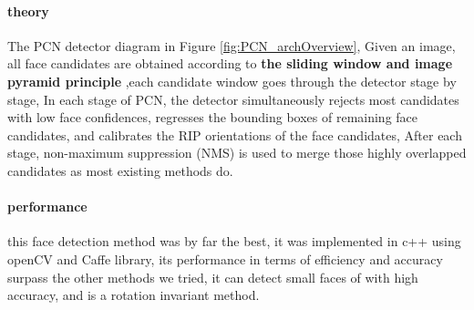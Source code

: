 \paragraph{theory}
The PCN detector diagram in Figure \ref{fig:PCN_archOverview}, Given an image, all face candidates are obtained according to \textbf{the sliding window and image pyramid principle} ,each candidate window goes through the detector stage by stage, In each stage of PCN, the detector simultaneously rejects most candidates with low face confidences, regresses the bounding boxes of remaining face candidates, and calibrates the RIP orientations of the face candidates, After each stage, non-maximum suppression (NMS) is used to merge those highly overlapped candidates as most existing methods do.
\paragraph{performance}
this face detection method was by far the best, it was implemented in c++ using openCV and Caffe library, its performance in terms of efficiency and accuracy surpass the other methods we tried, it can detect small faces of with high accuracy, and is a rotation invariant method.
